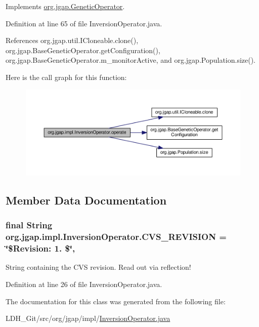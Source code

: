 Implements \hyperlink{interfaceorg_1_1jgap_1_1_genetic_operator_a0f9dfe925c4c21e07522be67d6c5d084}{org.\-jgap.\-Genetic\-Operator}.



Definition at line 65 of file Inversion\-Operator.\-java.



References org.\-jgap.\-util.\-I\-Cloneable.\-clone(), org.\-jgap.\-Base\-Genetic\-Operator.\-get\-Configuration(), org.\-jgap.\-Base\-Genetic\-Operator.\-m\-\_\-monitor\-Active, and org.\-jgap.\-Population.\-size().



Here is the call graph for this function\-:
\nopagebreak
\begin{figure}[H]
\begin{center}
\leavevmode
\includegraphics[width=350pt]{classorg_1_1jgap_1_1impl_1_1_inversion_operator_a7947681b60c19a585b1e0ee4595f625b_cgraph}
\end{center}
\end{figure}




\subsection{Member Data Documentation}
\hypertarget{classorg_1_1jgap_1_1impl_1_1_inversion_operator_aca94aa84453c49f1e60df6f95453ecd9}{
\subsubsection[{C\-V\-S\-\_\-\-R\-E\-V\-I\-S\-I\-O\-N}]{\setlength{\rightskip}{0pt plus 5cm}final String org.\-jgap.\-impl.\-Inversion\-Operator.\-C\-V\-S\-\_\-\-R\-E\-V\-I\-S\-I\-O\-N = \char`\"{}\$Revision\-: 1. \$\char`\"{}\hspace{0.3cm}{\ttfamily [static]}, {\ttfamily [private]}}}\label{classorg_1_1jgap_1_1impl_1_1_inversion_operator_aca94aa84453c49f1e60df6f95453ecd9}
String containing the C\-V\-S revision. Read out via reflection! 

Definition at line 26 of file Inversion\-Operator.\-java.



The documentation for this class was generated from the following file\-:\begin{DoxyCompactItemize}
\item 
L\-D\-H\-\_\-\-Git/src/org/jgap/impl/\hyperlink{_inversion_operator_8java}{Inversion\-Operator.\-java}\end{DoxyCompactItemize}

